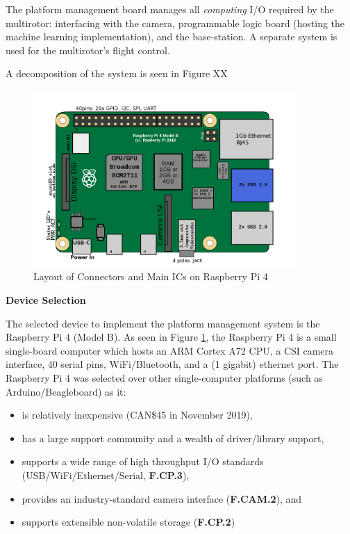 The platform management board manages all \textit{computing} I/O required by the multirotor: interfacing with the camera, programmable logic board (hosting the machine learning implementation), and the base-station. A separate system is used for the multirotor's flight control.

A decomposition of the system is seen in Figure XX

\begin{figure}\label{rpi}
\centering
\includegraphics[width=10cm]{img/RaspberryPi_Model_4B.png}
\caption{Layout of Connectors and Main ICs on Raspberry Pi 4}
\end{figure}

\textbf{Device Selection}

The selected device to implement the platform management system is the Raspberry Pi 4 (Model B). As seen in Figure \ref{rpi}, the Raspberry Pi 4 is a small single-board computer which hosts an ARM Cortex A72 CPU, a CSI camera interface, 40 serial pins, WiFi/Bluetooth, and a (1 gigabit) ethernet port. The Raspberry Pi 4 was selected over other single-computer platforms (such as Arduino/Beagleboard) as it:
\begin{itemize}
\item is relatively inexpensive (CAN\$45 in November 2019),
\item has a large support community and a wealth of driver/library support,
\item supports a wide range of high throughput I/O standards (USB/WiFi/Ethernet/Serial, \textbf{F.CP.3}),
\item provides an industry-standard camera interface (\textbf{F.CAM.2}), and
\item supports extensible non-volatile storage (\textbf{F.CP.2})\\
\end{itemize} 

